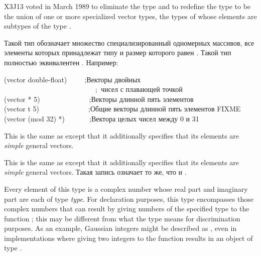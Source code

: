 \begin{flushdesc}
\begin{newer}
X3J13 voted in March 1989 
to eliminate the type  and to redefine the type
 to be the union of one or more specialized vector
types, the types of whose elements are subtypes of the type .
\end{newer}

\item[\cd{(vector \textit{тип-элемента} \textit{размер})}]
Такой тип обозначает множество специализированный одномерных массивов, все элементы
которых принадлежат типу  и размер которого равен
. Такой тип полностью эквивалентен .
Например:
\begin{lisp}
(vector double-float)~~~~~;\textrm{Векторы двойных } \\
~~~~~~~~~~~~~~~~~~~~~~~~~~;~\textrm{чисел с плавающей точкой} \\
(vector * 5)~~~~~~~~~~~~~~;\textrm{Векторы длинной пять элементов} \\
(vector t 5)~~~~~~~~~~~~~~;\textrm{Общие векторы длинной пять элементов FIXME} \\
(vector (mod 32) *)~~~~~~~;\textrm{Вектора целых чисел между 0 и 31}
\end{lisp}

\item[\cd{(simple-vector \textit{size})}]
This is the same
as  except that it additionally specifies
that its elements are \textit{simple} general vectors.

\item[\cd{(simple-vector \textit{размер})}]
This is the same
as  except that it additionally specifies
that its elements are \textit{simple} general vectors.
Такая запись означает то же, что и .

\item[\cd{(complex \textit{type})}]
Every element of this type is a
complex number whose real part
and imaginary part are each of type \textit{type}.
For declaration purposes, this type encompasses those complex numbers
that can result by giving numbers of the specified type
to the function ; this may be different
from what the type means for discrimination purposes.
As an example, Gaussian integers might be
described as , even in implementations
where giving two integers to the function  results
in an object of type .


\end{flushdesc}
